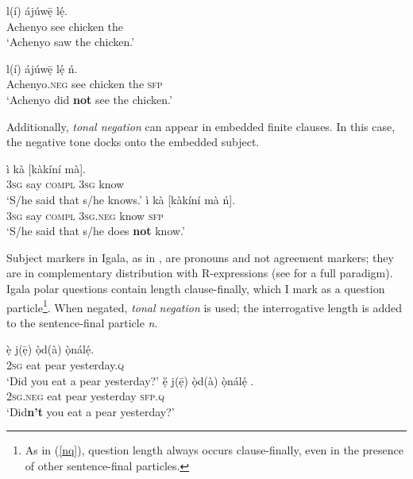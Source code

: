 \documentclass[output=paper,colorlinks,citecolor=brown,
]{langscibook}
\begin{document}
\ea \label{ex:chaperon:bark}
    \begin{xlist} 
    \ex\gll  {} l(\'{i}) \'{a}júw\={ẹ} l\'{ẹ}.\\
    Achenyo see chicken the\\
    \glt `Achenyo saw the chicken.'
    
    \ex\gll {} l(\'{i}) \'{a}júw\={ẹ} l\'{ẹ} \'{n}.\\
    Achenyo.\textsc{neg} see chicken the \textsc{sfp}\\
    \glt `Achenyo did \textbf{not} see the chicken.'
\end{xlist}
\z

Additionally, \textit{tonal negation} can appear in embedded finite clauses. In this case, the negative tone docks onto the embedded subject.


\ea \label{ex:chaperon:emb}
    \begin{xlist} \ex\gll  \`{i} k\`{a} [k\`{a}k\'{i}n\'{i}  m\`{a}].\\
        \textsc{3sg}            say \textsc{compl}        \textsc{3sg}        know\\
       \glt  `S/he said that s/he knows.'
    \ex\gll \`{i}  k\`{a} [k\`{a}k\'{i}n\'{i}   m\`{a} \'{n}].\\
        \textsc{3sg}      say   \textsc{compl}       \textsc{3sg}.\textsc{neg}     know            \textsc{sfp}\\
       \glt  `S/he said that s/he does \textbf{not} know.'
\end{xlist}
\z

Subject markers in Igala, as in , are pronouns and not agreement markers; they are in complementary distribution with R-expressions (see \citeauthor{Ejeba} \citeyear{Ejeba} for a full paradigm). Igala polar questions contain length clause-finally, which I mark as a question particle\footnote{As in (\ref{nq}), question length always occurs clause-finally, even in the presence of other sentence-final particles.}. When negated, \textit{tonal negation} is used; the interrogative length is added to the sentence-final particle \textit{n}.


\ea 
    \begin{xlist} \ex\gll  \`{ẹ} j(\={ẹ}) \`{ọ}d(\`{a}) \`{ọ}n\'{a}l\'{ẹ}.\\
        \textsc{2sg}     eat     pear     yesterday.\textsc{q}\\
       \glt  `Did you eat a pear yesterday?'
    \ex\gll\label{nq}\H{ẹ} j(\={ẹ}) \`{ọ}d(\`{a}) \`{ọ}n\'{a}l\'{ẹ} .\\
        \textsc{2sg}.\textsc{neg}     eat     pear     yesterday     \textsc{sfp}.\textsc{q}\\
       \glt  `Did\textbf{n’t} you eat a pear yesterday?'
\end{xlist}
\z
\end{document}
